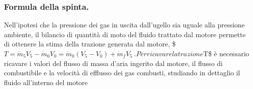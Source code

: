 \documentclass[letterpaper,10pt,italian]{jupyterBook}
\begin{document}
\subsubsection{Formula della spinta.}
\label{\detokenize{polimi/fluidmechanics-ita/template/capitoli/04_bilanci/04e03in:formula-della-spinta}}
\sphinxAtStartPar
Nell’ipotesi che la pressione dei gas in uscita dall’ugello sia uguale
alla pressione ambiente, il bilancio di quantità di moto del fluido
trattato dal motore permette di ottenere la stima della trazione
generata dal motore,
\$\(T = \dot{m}_5 V_5 - \dot{m}_0 V_0 = \dot{m}_0 ( V_5 - V_0 ) + \dot{m}_f V_5 \ .\)\(
Per ricavare la trazione \)T\$ è necessario ricavare i valori del flusso
di massa d’aria ingerito dal motore, il flusso di combustibile e la
velocità di efflusso dei gas combusti, studiando in dettaglio il fluido
all’interno del motore
\end{document}
